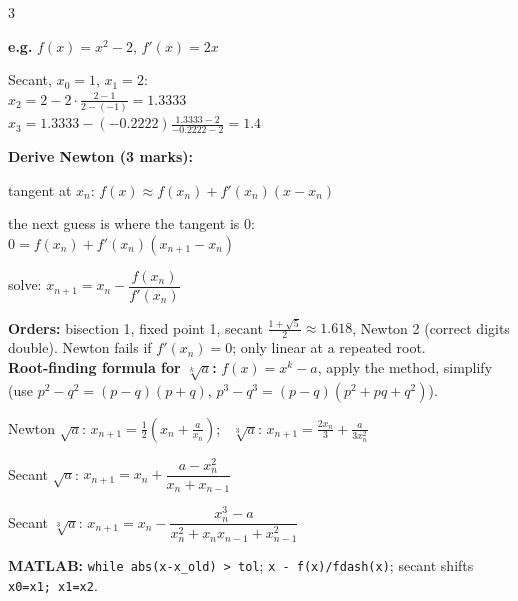 \documentclass[8pt,a4paper]{extarticle}
\newcommand{\sub}[1]{\textbf{\color{accent}#1}}
\newenvironment{ex}[1]{\par\vspace{2pt}\noindent\begin{lrbox}{\exbox}\begin{minipage}{\dimexpr\linewidth-2\fboxsep}\RaggedRight\color{grn}\textbf{e.g.} #1\par\setlength{\parskip}{1.5pt}}{\end{minipage}\end{lrbox}\colorbox{exbg}{\usebox{\exbox}}\par\vspace{1pt}}
\begin{document}
\begin{multicols*}{3}
\begin{ex}{$f(x)=x^2-2$, $f'(x)=2x$}
Secant, $x_0=1$, $x_1=2$:\\
$x_2=2-2\cdot\frac{2-1}{2-(-1)}=1.3333$\\
$x_3=1.3333-(-0.2222)\frac{1.3333-2}{-0.2222-2}=1.4$
\end{ex}
\sub{Derive Newton (3 marks):}
\begin{der}
\item tangent at $x_n$: $f(x)\approx f(x_n)+f'(x_n)(x-x_n)$
\item the next guess is where the tangent is 0:\\ $0=f(x_n)+f'(x_n)(x_{n+1}-x_n)$
\item solve: $x_{n+1}=x_n-\dfrac{f(x_n)}{f'(x_n)}$
\end{der}
\sub{Orders:} bisection 1, fixed point 1, secant $\frac{1+\sqrt5}{2}\approx1.618$, Newton 2 (correct digits double). Newton fails if $f'(x_n)=0$; only linear at a repeated root.\\
\sub{Root-finding formula for $\sqrt[k]a$:} $f(x)=x^k-a$, apply the method, simplify (use $p^2-q^2=(p-q)(p+q)$, $p^3-q^3=(p-q)(p^2+pq+q^2)$).
\begin{tl}
\item Newton $\sqrt a$: $x_{n+1}=\frac12(x_n+\frac a{x_n})$; \ $\sqrt[3]a$: $x_{n+1}=\frac{2x_n}{3}+\frac{a}{3x_n^2}$
\item Secant $\sqrt a$: $x_{n+1}=x_n+\dfrac{a-x_n^2}{x_n+x_{n-1}}$
\item Secant $\sqrt[3]a$: $x_{n+1}=x_n-\dfrac{x_n^3-a}{x_n^2+x_nx_{n-1}+x_{n-1}^2}$
\end{tl}
\sub{MATLAB:} \texttt{while abs(x-x\_old) > tol}; \texttt{x - f(x)/fdash(x)}; secant shifts \texttt{x0=x1; x1=x2}.


\end{multicols*}
\end{document}
